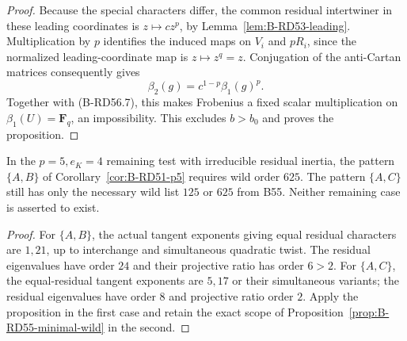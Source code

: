 \begin{proof}
Because the special characters differ, the common residual
intertwiner in these leading coordinates is $z\mapsto c z^p$,
by Lemma~\ref{lem:B-RD53-leading}. Multiplication by $p$
identifies the induced maps on $V_i$ and $pR_i$, since the
normalized leading-coordinate map is $z\mapsto z^q=z$.
Conjugation of the anti-Cartan matrices consequently gives
\[
                      \beta_2(g)=c^{1-p}\beta_1(g)^p.
\]
Together with (B-RD56.7), this makes Frobenius a fixed scalar
multiplication on $\beta_1(U)=\mathbf F_q$, an impossibility.
This excludes $b>b_0$ and proves the proposition.
\end{proof}

\begin{corollary}
\label{cor:B-RD56-p5}
In the $p=5,e_K=4$ remaining test with irreducible residual
inertia, the pattern $\{A,B\}$ of Corollary~\ref{cor:B-RD51-p5}
requires wild order $625$. The pattern $\{A,C\}$ still has
only the necessary wild list $125$ or $625$ from B55.
Neither remaining case is asserted to exist.
\end{corollary}
\begin{proof}
For $\{A,B\}$, the actual tangent exponents giving equal
residual characters are $1,21$, up to interchange and simultaneous quadratic twist. The residual eigenvalues have order $24$
and their projective ratio has order $6>2$.
For $\{A,C\}$, the equal-residual tangent exponents are $5,17$
or their simultaneous variants; the residual eigenvalues have
order $8$ and projective ratio order $2$.
Apply the proposition in the first case and retain the exact
scope of Proposition~\ref{prop:B-RD55-minimal-wild} in the second.
\end{proof}

